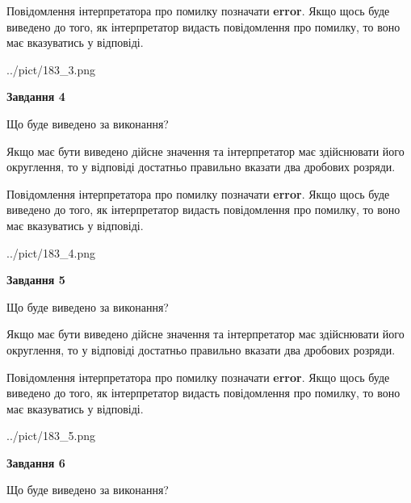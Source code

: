 \documentclass[12pt, ukrainian]{article}
\begin{document}
{\begin {Large}
Повідомлення інтерпретатора про помилку позначати \textbf{error}.
Якщо щось буде виведено до того, як інтерпретатор видасть повідомлення про помилку, 
то воно має вказуватись у відповіді. \par

\begin{center}
	{../pict/183_3.png}
\end{center}
\newpage

{\begin {center}\textbf{Завдання 4}\end {center}}\par
Що буде виведено за виконання? \par

Якщо має бути виведено дійсне значення та інтерпретатор має здійснювати його округлення, 
то у відповіді достатньо правильно вказати два дробових розряди.

Повідомлення інтерпретатора про помилку позначати \textbf{error}.
Якщо щось буде виведено до того, як інтерпретатор видасть повідомлення про помилку, 
то воно має вказуватись у відповіді. \par

\begin{center}
	{../pict/183_4.png}
\end{center}
\newpage

{\begin {center}\textbf{Завдання 5}\end {center}}\par
Що буде виведено за виконання? \par

Якщо має бути виведено дійсне значення та інтерпретатор має здійснювати його округлення, 
то у відповіді достатньо правильно вказати два дробових розряди.

Повідомлення інтерпретатора про помилку позначати \textbf{error}.
Якщо щось буде виведено до того, як інтерпретатор видасть повідомлення про помилку, 
то воно має вказуватись у відповіді. \par

\begin{center}
	{../pict/183_5.png}
\end{center}
\newpage

{\begin {center}\textbf{Завдання 6}\end {center}}\par
Що буде виведено за виконання? \par


\end{Large}}
\end{document}

